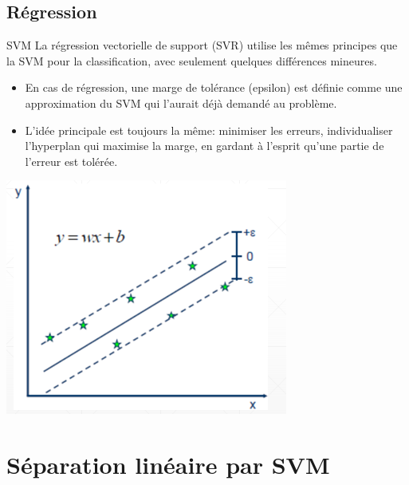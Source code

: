 \documentclass{bredelebeamer}
\begin{document}
\subsection{Régression}
\begin{frame}{SVM}
    La régression vectorielle de support (SVR) utilise les mêmes principes que la SVM pour la classification, avec seulement quelques différences mineures.\\
\begin{itemize}
         \item En cas de régression, une marge de tolérance (epsilon) est définie comme une approximation du SVM qui l'aurait déjà demandé au problème.
         \item L'idée principale est toujours la même: minimiser les erreurs, individualiser l'hyperplan qui maximise la marge, en gardant à l'esprit qu'une partie de l'erreur est tolérée.
\end{itemize}
\vfill
\begin{center} \includegraphics[scale=0.5]{4.png} \end{center}
\vfill
\end{frame}

\section{Séparation linéaire par SVM}
\end{document}
